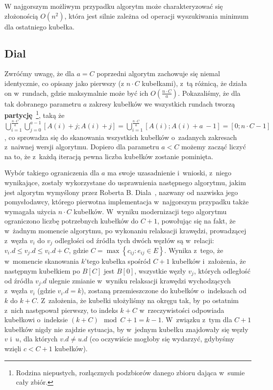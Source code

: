 W najgorszym możliwym przypadku algorytm może charakteryzować się złożonością $ O \left( n^{2} \right)$, która jest silnie zależna od operacji wyszukiwania minimum dla ostatniego kubełka.\label{DKMComplexity}

\subsection{Dial}

Zwróćmy uwagę, że dla $a=C$ poprzedni algorytm zachowuje się niemal identycznie, co opisany jako pierwszy (z $n \cdot C$ kubełkami), z~tą różnicą, że działa on w~rundach, gdzie maksymalnie może być ich $ O \left( \frac{n \cdot C}{a} \right) $. Pokazaliśmy, że dla tak dobranego parametru $a$ zakresy kubełków we wszystkich rundach tworzą \textbf{partycję}~\footnote{Rodzina niepustych, rozłącznych podzbiorów danego zbioru dająca w~sumie cały zbiór.}, taką że $\bigcup _{i=1}^{\frac{n \cdot C}{a}} \bigcup _{j=0}^{a-1} \left[ A \left( i \right ) + j ; A \left( i \right ) + j \right ] = \bigcup _{i=1}^{\frac{n \cdot C}{a}} \left[ A \left( i \right ) ; A \left( i \right ) + a~- 1 \right ] = \left[ 0 ; n \cdot C - 1 \right ]$, co sprowadza się do skanowania wszystkich kubełków o~zadanych zakresach z~naiwnej wersji algorytmu. Dopiero dla parametru $a < C$ możemy zacząć liczyć na to, że z~każdą iteracją pewna liczba kubełków zostanie pominięta. 

Wybór takiego ograniczenia dla $a$ ma swoje uzasadnienie i~wnioski, z~niego wynikające, zostały wykorzystane do usprawnienia następnego algorytmu, jakim jest algorytm wymyślony przez Roberta B. Diala~\cite[$4.6$]{Ahuja:1993:NFT:137406}, nazwany od nazwiska jego pomysłodawcy, którego pierwotna implementacja w~najgorszym przypadku także wymagała użycia $n \cdot C$ kubełków. W~wyniku modernizacji tego algorytmu ograniczono liczbę potrzebnych kubełków do $C+1$, powołując się na fakt, że w~żadnym momencie algorytmu, po wykonaniu relaksacji krawędzi, prowadzącej z~węzła $v_{i}$ do $v_{j}$ odległości od źródła tych dwóch węzłów są w~relacji: $v_{i}.d \leqslant v_{j}.d \leqslant v_{i}.d + C$, gdzie $C = \max \left\{ c_{ij} : e_{ij} \in E \right\}$. Wynika z~tego, że w~momencie skanowania $k$'tego kubełka spośród $C + 1$ kubełków i~założenia, że następnym kubełkiem po $B \left[ C \right] $ jest $B \left[ 0 \right] $, wszystkie węzły $v_{j}$, których odległość od źródła $v_{j}.d$ ulegnie zmianie w~wyniku relaksacji krawędzi wychodzących z~węzła $v_{i}$ (gdzie $v_{i}.d = k$), zostaną przemieszczone do kubełków o~indeksach od $k$ do $k + C$. Z~założenia, że kubełki ułożyliśmy na okręgu tak, by po ostatnim z~nich następował pierwszy, to indeks $k + C$ w~rzeczywistości odpowiada kubełkowi o~indeksie $ \left( k + C \right) \mod{C+1} = k - 1$. W~związku z~tym dla $C+1$ kubełków nigdy nie zajdzie sytuacja, by w~jednym kubełku znajdowały się węzły $v$ i~$u$, dla których $v.d \neq u.d$ (co oczywiście mogłoby się wydarzyć, gdybyśmy wzięli $c < C + 1$ kubełków).

